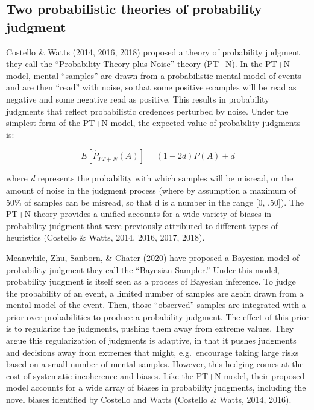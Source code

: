 \documentclass[
  english,
  man,floatsintext]{apa6}
\begin{document}
\hypertarget{two-probabilistic-theories-of-probability-judgment}{%
\subsection{Two probabilistic theories of probability judgment}\label{two-probabilistic-theories-of-probability-judgment}}

Costello \& Watts (2014, 2016, 2018) proposed a theory of probability judgment they call the ``Probability Theory plus Noise'' theory (PT+N). In the PT+N model, mental ``samples'' are drawn from a probabilistic mental model of events and are then ``read'' with noise, so that some positive examples will be read as negative and some negative read as positive. This results in probability judgments that reflect probabilistic credences perturbed by noise. Under the simplest form of the PT+N model, the expected value of probability judgments is:

\[E[\hat{P}_{PT+N}(A)] = (1-2d)P(A) + d \]

where \emph{d} represents the probability with which samples will be misread, or the amount of noise in the judgment process (where by assumption a maximum of 50\% of samples can be misread, so that d is a number in the range {[}0, .50{]}). The PT+N theory provides a unified accounts for a wide variety of biases in probability judgment that were previously attributed to different types of heuristics (Costello \& Watts, 2014, 2016, 2017, 2018).

Meanwhile, Zhu, Sanborn, \& Chater (2020) have proposed a Bayesian model of probability judgment they call the ``Bayesian Sampler.'' Under this model, probability judgment is itself seen as a process of Bayesian inference. To judge the probability of an event, a limited number of samples are again drawn from a mental model of the event. Then, those ``observed'' samples are integrated with a prior over probabilities to produce a probability judgment. The effect of this prior is to regularize the judgments, pushing them away from extreme values. They argue this regularization of judgments is adaptive, in that it pushes judgments and decisions away from extremes that might, e.g.~encourage taking large risks based on a small number of mental samples. However, this hedging comes at the cost of systematic incoherence and biases. Like the PT+N model, their proposed model accounts for a wide array of biases in probability judgments, including the novel biases identified by Costello and Watts (Costello \& Watts, 2014, 2016).
\end{document}
